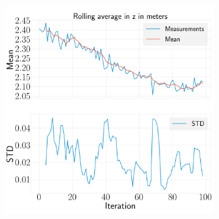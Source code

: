 \documentclass[../Head/report.tex]{subfiles}
\begin{document}
\begin{figure}[H]
\begin{subfigure}[t]{.30\textwidth}
        \caption{}
        \label{fig:GPS2Vision_pose_estimation_test2_roll}
    \end{subfigure}
     \hspace{0.2em}
    \begin{subfigure}[t]{.30\textwidth}
        \centering
        \includegraphics[width=\textwidth]{../Figures/analyse_rolling_average/test1/Calculated_rolling_average_in_z_with_mean_and_STD.png}
        \caption{}
        \label{fig:GPS2Vision_pose_estimation_test2_roll}
    \end{subfigure}
    \caption{}
    \label{fig:GPS2Vision_pose_estimation_test2_error_ori}
\end{figure}
\end{document}
